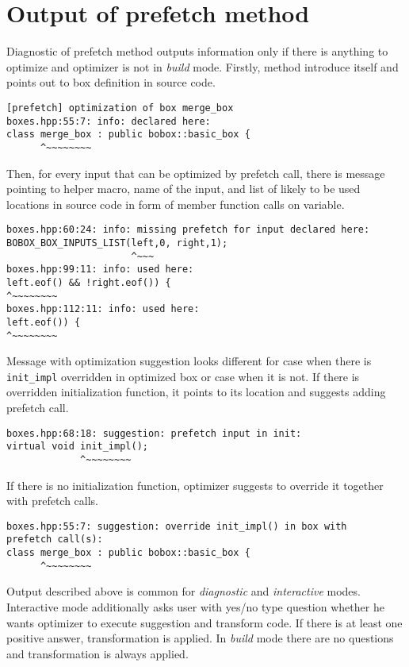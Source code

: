 \documentclass[12pt,a4paper]{report}
\def\code#1{\texttt{#1}}
\begin{document}
\section{Output of prefetch method}
Diagnostic of prefetch method outputs information only if there is anything to optimize and optimizer is not in \emph{build} mode. Firstly, method introduce itself and points out to box definition in source code.

{\footnotesize
\begin{verbatim}
[prefetch] optimization of box merge_box
boxes.hpp:55:7: info: declared here:
class merge_box : public bobox::basic_box {
      ^~~~~~~~~
\end{verbatim}
}

Then, for every input that can be optimized by prefetch call, there is message pointing to helper macro, name of the input, and list of likely to be used locations in source code in form of member function calls on variable.

{\footnotesize
\begin{verbatim}
boxes.hpp:60:24: info: missing prefetch for input declared here:
BOBOX_BOX_INPUTS_LIST(left,0, right,1);
                      ^~~~
boxes.hpp:99:11: info: used here:
left.eof() && !right.eof()) {
^~~~~~~~~
boxes.hpp:112:11: info: used here:
left.eof()) {
^~~~~~~~~
\end{verbatim}
}

Message with optimization suggestion looks different for case when there is \code{init\_impl} overridden in optimized box or case when it is not. If there is overridden initialization function, it points to its location and suggests adding prefetch call.

{\footnotesize
\begin{verbatim}
boxes.hpp:68:18: suggestion: prefetch input in init:
virtual void init_impl();
             ^~~~~~~~~
\end{verbatim}
}

If there is no initialization function, optimizer suggests to override it together with prefetch calls.

{\footnotesize
\begin{verbatim}
boxes.hpp:55:7: suggestion: override init_impl() in box with
prefetch call(s):
class merge_box : public bobox::basic_box {
      ^~~~~~~~~
\end{verbatim}
}

Output described above is common for \emph{diagnostic} and \emph{interactive} modes. Interactive mode additionally asks user with yes/no type question whether he wants optimizer to execute suggestion and transform code. If there is at least one positive answer, transformation is applied. In \emph{build} mode there are no questions and transformation is always applied.
\end{document}
